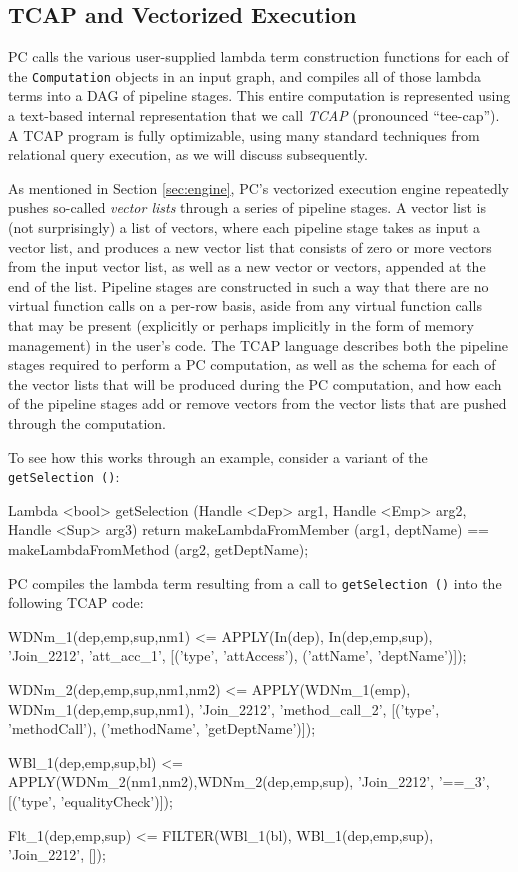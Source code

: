 \subsection{TCAP and Vectorized Execution} \label{sec:vectorized}


PC calls the various user-supplied lambda term construction functions for each of the \texttt{Computation} objects in an
input graph, and compiles all of those lambda terms into a DAG of pipeline stages.  
This entire computation is represented using a text-based internal representation that we call
\emph{TCAP} (pronounced ``tee-cap'').  A TCAP program is fully optimizable, using many standard techniques from relational query execution, as we
will discuss subsequently.

As mentioned in Section \ref{sec:engine}, PC's vectorized execution engine repeatedly pushes 
so-called \emph{vector lists} through a series of pipeline stages.  A vector list is (not surprisingly) a list of vectors, where each pipeline stage
takes as input a vector list,
and produces a 
new vector list that consists of zero or more vectors from the input vector list, as well as a new vector or vectors, appended at the end of the list.
Pipeline stages are constructed in such a way that there are no virtual function calls on a per-row basis, aside from any virtual function calls that may be
present (explicitly or perhaps implicitly in the form of memory management) in the user's code.
The TCAP language describes both the pipeline stages required to perform a PC computation, as well as the schema for each of the vector lists that
will be produced during the PC computation, and how each of the pipeline stages add or remove vectors from the vector lists that are pushed through
the computation.

To see how this works through an example, consider a variant of the \texttt{getSelection ()}:

\begin{codesmall} 
Lambda <bool> getSelection (Handle <Dep> arg1, Handle <Emp> arg2, Handle <Sup> arg3) {
	return makeLambdaFromMember (arg1, deptName) == 
	       makeLambdaFromMethod (arg2, getDeptName);  }
\end{codesmall}

\noindent PC compiles the lambda term resulting from a call to \texttt{getSelection ()} into the following TCAP code:

\begin{codesmall}
WDNm_1(dep,emp,sup,nm1) <= APPLY(In(dep), In(dep,emp,sup), 'Join_2212', 'att_acc_1', 
  [('type', 'attAccess'), ('attName', 'deptName')]);

WDNm_2(dep,emp,sup,nm1,nm2) <= APPLY(WDNm_1(emp), WDNm_1(dep,emp,sup,nm1), 'Join_2212',
  'method_call_2', [('type', 'methodCall'), ('methodName', 'getDeptName')]);

WBl_1(dep,emp,sup,bl) <= APPLY(WDNm_2(nm1,nm2),WDNm_2(dep,emp,sup), 'Join_2212', '==_3', 
  [('type', 'equalityCheck')]);

Flt_1(dep,emp,sup) <= FILTER(WBl_1(bl), WBl_1(dep,emp,sup), 'Join_2212', []);
\end{codesmall}

